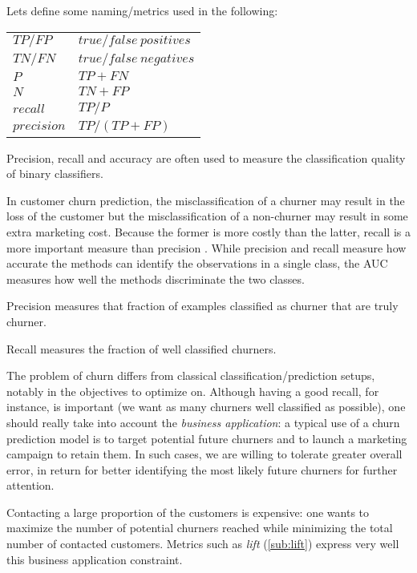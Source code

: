 Lets define some naming/metrics used in the following:

{\ttfamily
\begin{table}[H]
    \centering
    \begin{tabular}{ll}
        \toprule
        $TP / FP$          &    $true/false\ positives$ \\
        $TN / FN$       &    $true/false\ negatives$  \\
        $P$       &    $TP+FN$ \\
        $N$    &    $TN + FP$ \\
        $recall$      &    ${TP} / {P}$ \\
        $precision$        &   ${TP} / {(TP+FP)}$ \\
        \bottomrule
    \end{tabular}
\end{table}
}

Precision, recall and accuracy are often used to measure the classification quality of binary classifiers.

In customer churn prediction, the misclassification of a churner may result in the loss of the customer but the misclassification of a non-churner may result in some extra marketing cost.  Because the former is more costly than the latter, recall is a more important measure than precision \cite{VdP05}.
While precision and recall measure how accurate the methods can identify the observations in a single class, the AUC measures how well the methods discriminate the two classes.

Precision measures that fraction of examples classified as churner that are truly churner.

Recall measures the fraction of well classified churners.


The problem of churn differs from classical classification/prediction setups, notably in the objectives to optimize on. Although having a good recall, for instance, is important (we want as many churners well classified as possible), one should really take into account the \textit{business application}: a typical use of a churn prediction model is to target potential future churners and to launch a marketing campaign to retain them. In such cases, we are willing to tolerate greater overall error, in return for better identifying the most likely future churners for further attention.

Contacting a large proportion of the customers is expensive: one wants to maximize the number of potential churners reached while minimizing the total number of contacted customers. Metrics such as \textit{lift} (\ref{sub:lift}) express very well this business application constraint.


